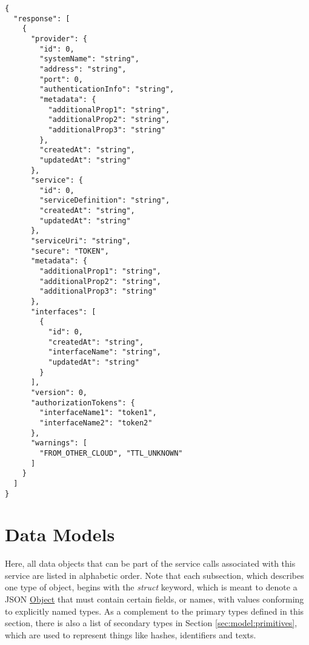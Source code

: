 \documentclass[a4paper]{arrowhead}
\newcommand{\fref}[1]{{\textcolor{ArrowheadBlue}{\hyperref[sec:functions:#1]{#1}}}}
\newcommand{\pref}[1]{{\textcolor{ArrowheadGrey}{\hyperref[sec:model:primitives:#1]{#1}}}}
\begin{document}
\begin{lstlisting}[language=http,label={lst:orchestration_response},caption={An \fref{orchestration-service} response.}]
{
  "response": [
    {
      "provider": {
        "id": 0,
        "systemName": "string",
        "address": "string",
        "port": 0,
        "authenticationInfo": "string",
        "metadata": {
          "additionalProp1": "string",
          "additionalProp2": "string",
          "additionalProp3": "string"
        },  
        "createdAt": "string",
        "updatedAt": "string"
      },
      "service": {
        "id": 0,
        "serviceDefinition": "string",
        "createdAt": "string",
        "updatedAt": "string"
      },
      "serviceUri": "string",
      "secure": "TOKEN",
      "metadata": {
        "additionalProp1": "string",
        "additionalProp2": "string",
        "additionalProp3": "string"
      },  
      "interfaces": [
        {
          "id": 0,
          "createdAt": "string",
          "interfaceName": "string",
          "updatedAt": "string"
        }
      ],
      "version": 0,
      "authorizationTokens": {
        "interfaceName1": "token1",
        "interfaceName2": "token2"
      },
      "warnings": [
        "FROM_OTHER_CLOUD", "TTL_UNKNOWN"
      ]
    }
  ]
}
\end{lstlisting}

\newpage

\section{Data Models}
\label{sec:model}

Here, all data objects that can be part of the service calls associated with this service are listed in alphabetic order.
Note that each subsection, which describes one type of object, begins with the \textit{struct} keyword, which is meant to denote a JSON \pref{Object} that must contain certain fields, or names, with values conforming to explicitly named types.
As a complement to the primary types defined in this section, there is also a list of secondary types in Section \ref{sec:model:primitives}, which are used to represent things like hashes, identifiers and texts.

\label{sec:model:OrchestrationForm}
\end{document}
